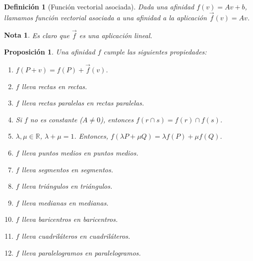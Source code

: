 \documentclass[11pt, a4paper]{article}
\newif\IfInSansMode
\newcommand{\R}{\mathbb{R}}
\renewcommand{\vec}{\overrightarrow}
\theoremstyle{theorem-style}
\newtheorem{nprop}{Proposición}[section]
\theoremstyle{definition-style}
\newtheorem{ndef}{Definición}[section]
\theoremstyle{remark-style}
\newtheorem*{nota}{Nota}
\theoremstyle{example-style}
\newenvironment{nlist}
{\begin{enumerate}
    \renewcommand\labelenumi{(\emph{\roman{enumi})}}}
  {\end{enumerate}}
\begin{document}
\begin{ndef}[Función vectorial asociada]
  Dada una afinidad $f(v) = Av + b$, llamamos función vectorial asociada a una afinidad a la aplicación $\vec{f}(v) = Av$.
\end{ndef}

\begin{nota}
	Es claro que $\vec{f}$ es una aplicación lineal.
\end{nota}

\begin{nprop}
Una afinidad $f$ cumple las siguientes propiedades:
  \begin{nlist}
    \item $f(P + v) = f(P) + \vec{f}(v)$.
\item $f$ lleva rectas en rectas.
\item $f$ lleva rectas paralelas en rectas paralelas.
\item Si $f$ no es constante ($A \ne 0$), entonces $f(r\cap s) = f(r) \cap f(s)$.
\item $\lambda,\mu \in \R$, $\lambda+\mu=1$. Entonces, $f(\lambda P + \mu Q) = \lambda f(P) +  \mu f(Q)$.
\item $f$ lleva puntos medios en puntos medios.
\item $f$ lleva segmentos en segmentos.
\item $f$ lleva triángulos en triángulos.
\item $f$ lleva medianas en medianas.
\item $f$ lleva baricentros en baricentros.
\item $f$ lleva cuadriláteros en cuadriláteros.
\item $f$ lleva paralelogramos en paralelogramos.
  \end{nlist}
\end{nprop}
\end{document}
